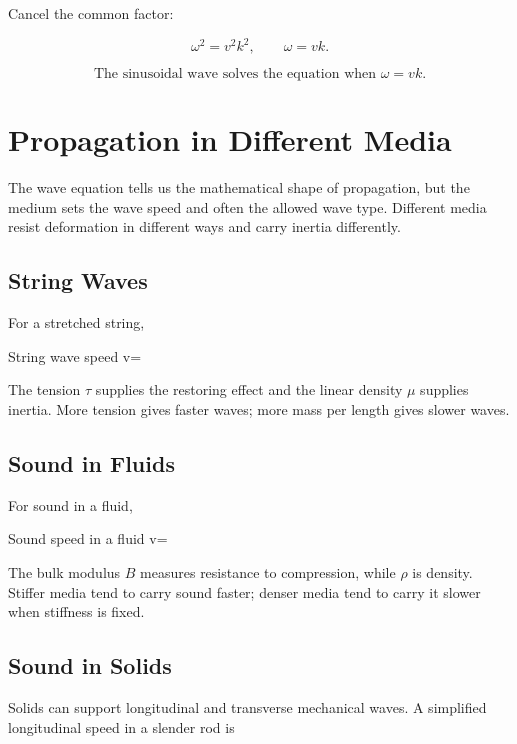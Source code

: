 \documentclass{studentnotes}
\begin{document}
Cancel the common factor:

\[
    \omega^2=v^2k^2,
    \qquad
    \omega=vk.
\]

\[
    \boxed{\text{The sinusoidal wave solves the equation when } \omega=vk.}
\]

\section{Propagation in Different Media}

The wave equation tells us the mathematical shape of propagation, but the medium
sets the wave speed and often the allowed wave type. Different media resist
deformation in different ways and carry inertia differently.

\subsection{String Waves}

For a stretched string,

\begin{namedformula}{String wave speed}
    v=\sqrt{\frac{\tau}{\mu}}
\end{namedformula}

The tension \(\tau\) supplies the restoring effect and the linear density
\(\mu\) supplies inertia. More tension gives faster waves; more mass per length
gives slower waves.

\subsection{Sound in Fluids}

For sound in a fluid,

\begin{namedformula}{Sound speed in a fluid}
    v=
\end{namedformula}

The bulk modulus \(B\) measures resistance to compression, while \(\rho\) is
density. Stiffer media tend to carry sound faster; denser media tend to carry it
slower when stiffness is fixed.

\subsection{Sound in Solids}

Solids can support longitudinal and transverse mechanical waves. A simplified
longitudinal speed in a slender rod is
\end{document}
